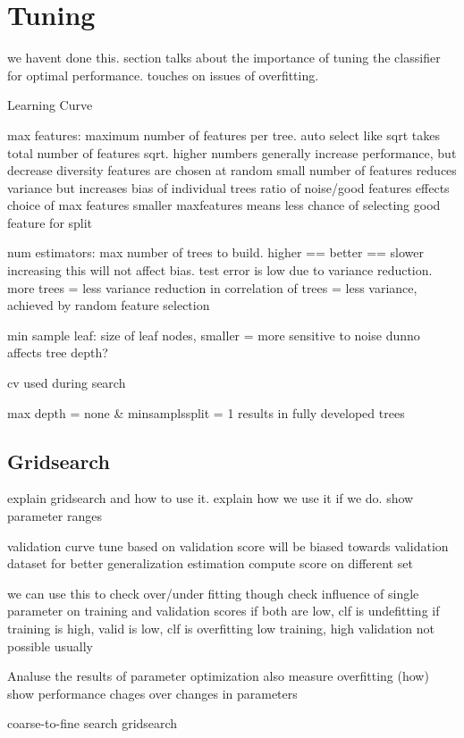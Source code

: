 \section{Tuning}\label{sec:tuning}
we havent done this.
section talks about the importance of tuning the classifier for
optimal performance.
touches on issues of overfitting.

Learning Curve

max features: maximum number of features per tree. auto select like sqrt takes 
total number of features sqrt.
higher numbers generally increase performance, but decrease diversity
features are chosen at random
small number of features reduces variance but increases bias of individual trees
ratio of noise/good features effects choice of max features
smaller maxfeatures means less chance of selecting good feature for split

num estimators: max number of trees to build. higher == better == slower
increasing this will not affect bias. test error is low due to variance reduction.
more trees = less variance
reduction in correlation of trees = less variance, achieved by random feature
selection

min sample leaf: size of leaf nodes, smaller = more sensitive to noise
dunno
affects tree depth?


cv used during search

max depth = none & minsamplssplit = 1 results in fully developed trees




\subsection{Gridsearch}
explain gridsearch and how to use it.
explain how we use it if we do.
show parameter ranges

validation curve
tune based on validation score
will be biased towards validation dataset
for better generalization estimation compute score on different set

we can use this to check over/under fitting though
check influence of single parameter on training and validation scores
if both are low, clf is undefitting
if training is high, valid is low, clf is overfitting
low training, high validation not possible usually

Analuse the results of parameter optimization
also measure overfitting (how)
show performance chages over changes in parameters

coarse-to-fine search gridsearch

